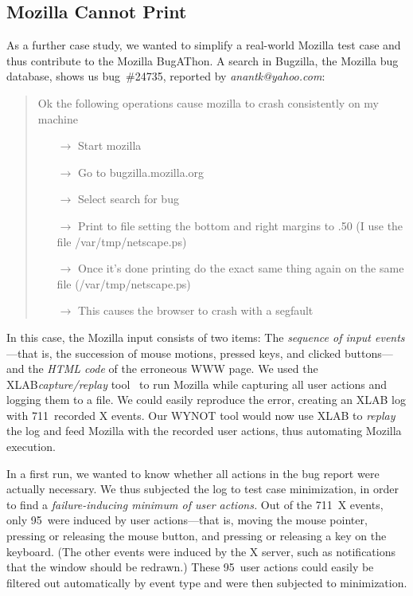 \documentclass{acm_proc_article-sp}
\newcommand{\HTML}       {{\small HTML}\xspace}
\newcommand{\WWW}        {{\small WWW}\xspace}
\newcommand{\WYNOT}      {{\small WYNOT}\xspace}
\newcommand{\XLAB}       {{\small XLAB}\xspace}
\theoremstyle{plain}
\begin{document}
\subsection{Mozilla Cannot Print}
\label{sec:mozilla}

\noindent
As a further case study, we wanted to simplify a real-world Mozilla
test case and thus contribute to the Mozilla BugAThon.  A search in
Bugzilla, the Mozilla bug database, shows us bug~\#24735, reported by
\emph{anantk@yahoo.com}:

\begin{quotation}\small
\noindent
Ok the following operations cause mozilla to crash consistently on my machine

\begin{itemize}
\item[$\to$] Start mozilla
\item[$\to$] Go to bugzilla.mozilla.org
\item[$\to$] Select search for bug
\item[$\to$] Print to file setting the bottom and right margins to .50 
(I use the file /var/tmp/netscape.ps)
\item[$\to$] Once it's done printing do the exact same thing again on 
the same file (/var/tmp/netscape.ps)
\item[$\to$] This causes the browser to crash with a segfault
\end{itemize}
\end{quotation}

\noindent
In this case, the Mozilla input consists of two items: The
\emph{sequence of input events}---that is, the succession of mouse
motions, pressed keys, and clicked buttons---and the \emph{\HTML code}
of the erroneous \WWW page.  We used the \XLAB \emph{capture/replay}
tool~\cite{vertes/98/xlab} to run Mozilla while capturing all user
actions and logging them to a file.  We could easily reproduce the
error, creating an \XLAB log with 711~recorded X events.  Our \WYNOT
tool would now use \XLAB to \emph{replay} the log and feed Mozilla
with the recorded user actions, thus automating Mozilla execution.

In a first run, we wanted to know whether all actions in the bug
report were actually necessary.  We thus subjected the log to test
case minimization, in order to find a \emph{failure-inducing minimum
  of user actions.}  Out of the 711~X events, only 95~were induced by
user actions---that is, moving the mouse pointer, pressing or
releasing the mouse button, and pressing or releasing a key on the
keyboard.  (The other events were induced by the X server, such as
notifications that the window should be redrawn.)  These 95~user
actions could easily be filtered out automatically by event type and
were then subjected to minimization.
\end{document}
